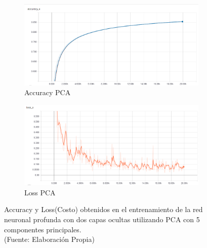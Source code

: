 \begin{figure}[ht!]
\centering
\begin{subfigure}{.5\textwidth}
  \centering
  \includegraphics[width=.8\linewidth]{figures/nn_plot_pca.png}
  \caption{Accuracy PCA}
  \label{fig:sub1}
\end{subfigure}%
\begin{subfigure}{.5\textwidth}
  \centering
  \includegraphics[width=.8\linewidth]{figures/nn_loss_pca.png}
  \caption{Loss PCA}
  \label{fig:sub2}
\end{subfigure}
\caption[abs]{Accuracy y Loss(Costo) obtenidos en el entrenamiento de la red neuronal profunda con dos capas ocultas utilizando PCA con 5 componentes principales. \\
{\scriptsize (Fuente: Elaboración Propia)}}
\label{fig:nn_metrics_pca}
\end{figure}

